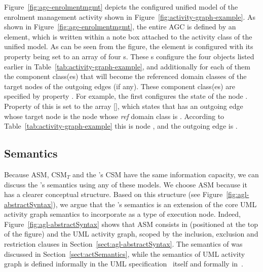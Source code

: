 Figure~\ref{fig:agc-enrolmentmgmt} depicts the configured unified model of the enrolment management activity shown in  Figure~\ref{fig:activity-graph-example}. As shown in Figure~\ref{fig:agc-enrolmentmgmt}, the entire AGC is defined by an  element, which is written within a note box attached to the activity class  of the unified model.
%
As can be seen from the figure, the  element is configured with its property  being set to an array of four s. These s configure the four  objects listed earlier in Table~\ref{tab:activity-graph-example}, and additionally for each of them the component class(es) that will become the referenced domain classes of the target nodes of the outgoing edges (if any). These component class(es) are specified by property . For example, the first  configures the state of the node . Property  of this  is set to the array [], which states that  has an outgoing edge whose target node is the node whose \textit{ref} domain class is . According to Table~\ref{tab:activity-graph-example} this is node , and the outgoing edge is .

\subsection{Semantics} \label{sect:agl-semantics}

Because ASM, CSM$_T$ and the \agl's CSM have the same information capacity, we can discuss the \agl's semantics using any of these models. We choose ASM because it has a clearer conceptual structure. Based on this structure (see Figure~\ref{fig:agl-abstractSyntax}), we argue that the \agl's semantics is an extension of the core UML activity graph semantics to incorporate  as a type of execution node. Indeed, Figure~\ref{fig:agl-abstractSyntax} shows that ASM consists in  (positioned at the top of the figure) and the UML activity graph, scoped by the inclusion, exclusion and restriction clauses in Section~\ref{sect:agl-abstractSyntax}. The semantics of  was discussed in Section~\ref{sect:actSemantics}, while the semantics of UML activity graph is defined informally in the UML specification~\cite{omg_unified_2015} itself and formally in~\cite{daw_extensible_2015}.

